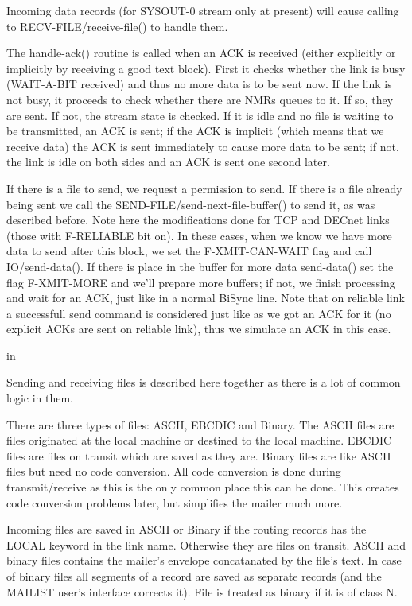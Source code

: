 Incoming  data  records (for SYSOUT-0 stream only at present) will cause
calling to RECV-FILE/receive-file() to handle them.

The handle-ack() routine is called  when  an  ACK  is  received  (either
explicitly  or  implicitly  by  receiving  a  good text block). First it
checks whether the link is busy (WAIT-A-BIT received) and thus  no  more
data  is  to  be sent now. If the link is not busy, it proceeds to check
whether there are NMRs queues to it. If so, they are sent. If  not,  the
stream  state  is  checked.  If  it is idle and no file is waiting to be
transmitted, an ACK is sent; if the ACK is implicit (which means that we
receive data) the ACK is sent immediately to cause more data to be sent;
if not, the link is idle on both sides and an ACK  is  sent  one  second
later.

If there is a file to send, we request a permission to send. If there is
a file already being sent we call the  SEND-FILE/send-next-file-buffer()
to  send  it,  as was described before. Note here the modifications done
for TCP and DECnet links (those with F-RELIABLE bit on). In these cases,
when  we  know  we  have  more data to send after this block, we set the
F-XMIT-CAN-WAIT flag and call IO/send-data(). If there is place  in  the
buffer  for  more  data  send-data()  set the flag F-XMIT-MORE and we'll
prepare more buffers; if not, we finish processing and wait for an  ACK,
just  like  in  a  normal  BiSync  line.  Note  that  on reliable link a
successfull send command is considered just like as we got an ACK for it
(no explicit ACKs are sent on reliable link), thus we simulate an ACK in
this case.

 in

Sending and receiving files is described here together as there is  a
lot of common logic in them.

There  are  three types of files: ASCII, EBCDIC and Binary. The ASCII
files are files originated at the local machine or destined to the local
machine.  EBCDIC files are files on transit which are saved as they are.
Binary files are like ASCII files but need no code conversion. All  code
conversion  is  done  during transmit/receive as this is the only common
place this can be done. This creates code conversion problems later, but
simplifies the mailer much more.

Incoming  files  are  saved in ASCII or Binary if the routing records
has the LOCAL keyword in the link name.  Otherwise  they  are  files  on
transit.   ASCII   and  binary  files  contains  the  mailer's  envelope
concatanated by the file's text. In case of binary files all segments of
a record are saved as separate records (and the MAILIST user's interface
corrects it). File is treated as binary if it is of class N.

